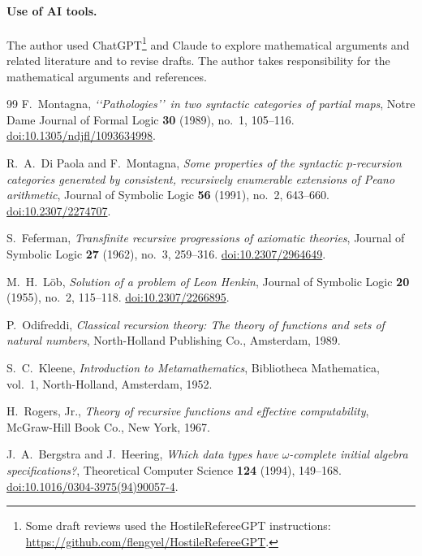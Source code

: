 \documentclass[11pt]{article}
\begin{document}
\paragraph{Use of AI tools.}
The author used ChatGPT\footnote{Some draft reviews used the
HostileRefereeGPT instructions:
\url{https://github.com/flengyel/HostileRefereeGPT}.}
and Claude to explore mathematical arguments and related literature
and to revise drafts. The author takes responsibility for the
mathematical arguments and references.

\begin{thebibliography}{99}
\small
{}
F.~Montagna,
\emph{\lq\lq Pathologies\rq\rq\ in two syntactic categories of partial maps},
Notre Dame Journal of Formal Logic \textbf{30} (1989), no.~1, 105--116.
\href{https://doi.org/10.1305/ndjfl/1093634998}{doi:10.1305/ndjfl/1093634998}.

R.~A.~Di Paola and F.~Montagna,
\emph{Some properties of the syntactic $p$-recursion categories generated
by consistent, recursively enumerable extensions of Peano arithmetic},
Journal of Symbolic Logic \textbf{56} (1991), no.~2, 643--660.
\href{https://doi.org/10.2307/2274707}{doi:10.2307/2274707}.

S.~Feferman,
\emph{Transfinite recursive progressions of axiomatic theories},
Journal of Symbolic Logic \textbf{27} (1962), no.~3, 259--316.
\href{https://doi.org/10.2307/2964649}{doi:10.2307/2964649}.

M.~H.~L\"ob,
\emph{Solution of a problem of Leon Henkin},
Journal of Symbolic Logic \textbf{20} (1955), no.~2, 115--118.
\href{https://doi.org/10.2307/2266895}{doi:10.2307/2266895}.

P.~Odifreddi,
\emph{Classical recursion theory:
The theory of functions and sets of natural numbers},
North-Holland Publishing Co., Amsterdam, 1989.

S.~C.~Kleene,
\emph{Introduction to Metamathematics},
Bibliotheca Mathematica, vol.~1,
North-Holland, Amsterdam, 1952.

H.~Rogers, Jr.,
\emph{Theory of recursive functions and effective computability},
McGraw-Hill Book Co., New York, 1967.

J.~A.~Bergstra and J.~Heering,
\emph{Which data types have $\omega$-complete initial algebra specifications?},
Theoretical Computer Science \textbf{124} (1994), 149--168.
\href{https://doi.org/10.1016/0304-3975(94)90057-4}{doi:10.1016/0304-3975(94)90057-4}.


\end{thebibliography}
\end{document}
